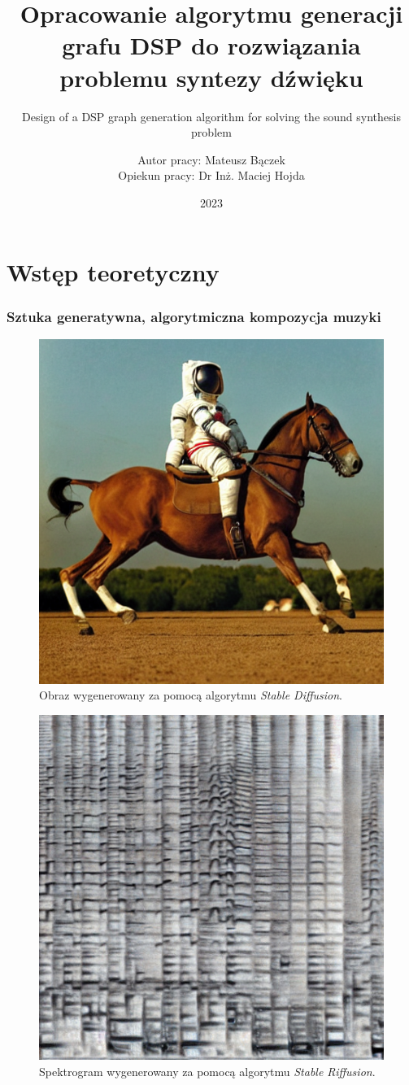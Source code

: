 \documentclass[]{beamer}
\title{Opracowanie algorytmu generacji grafu DSP do rozwiązania problemu syntezy dźwięku}
\subtitle{Design of a DSP graph generation algorithm for solving the sound synthesis problem}
\author{Autor pracy: Mateusz Bączek \\ Opiekun pracy: Dr Inż. Maciej Hojda}
\institute{Seminarium Dyplomowe -- prezentacja 1}
\date{2023}
\begin{document}
\onehalfspacing
\frame{\titlepage}

\section{Wstęp teoretyczny}


\begin{frame}
  \frametitle{Sztuka generatywna, algorytmiczna kompozycja muzyki}

  \begin{multicols}{2}

  \begin{figure}
    \includegraphics[width=0.9\linewidth]{stable_diffusion.png}
    \caption{Obraz wygenerowany za pomocą algorytmu \textit{Stable Diffusion}.}
  \end{figure}

  \begin{figure}
    \includegraphics[width=0.8\linewidth]{riffusion_spectro.jpg}
    \caption{Spektrogram wygenerowany za pomocą algorytmu \textit{Stable Riffusion}.}
  \end{figure}


\end{multicols}
\end{frame}
\end{document}
